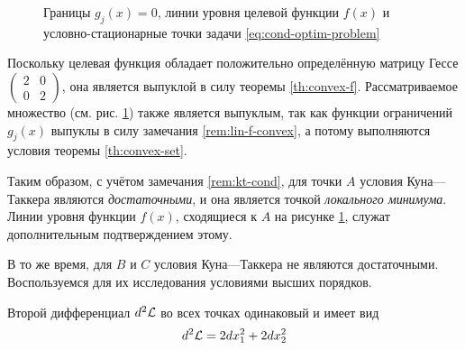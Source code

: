 \begin{figure}[!h]
  \centering
  \caption{Границы $g_j(x)=0$, линии уровня
    целевой функции $f(x)$ и условно-стационарные точки задачи
    \eqref{eq:cond-optim-problem}}
  \label{fig:cond-optim}
\end{figure}

Поскольку целевая функция обладает положительно определённую матрицу
Гессе $\left( \begin{smallmatrix}2 & 0 \\ 0 & 2\end{smallmatrix}
\right)$, она является выпуклой в силу теоремы \ref{th:convex-f}.
Рассматриваемое множество (см. рис. \ref{fig:cond-optim}) также
является выпуклым, так как функции ограничений $g_j(x)$ выпуклы в силу
замечания \ref{rem:lin-f-convex}, а потому выполняются условия теоремы
\ref{th:convex-set}.

Таким образом, с учётом замечания \ref{rem:kt-cond}, для точки $A$
условия Куна—Таккера являются \emph{достаточными}, и она является
точкой \emph{локального минимума}. Линии уровня функции $f(x)$,
сходящиеся к $A$ на рисунке \ref{fig:cond-optim}, служат
дополнительным подтверждением этому.

В то же время, для $B$ и $C$ условия Куна—Таккера не являются
достаточными. Воспользуемся для их исследования условиями высших
порядков.

Второй дифференциал $d^2\mathcal{L}$ во всех точках одинаковый и имеет вид
\begin{equation}
  \label{eq:la-diff}
  d^2\mathcal{L} = 2dx_1^2 + 2 dx_2^2
\end{equation}

